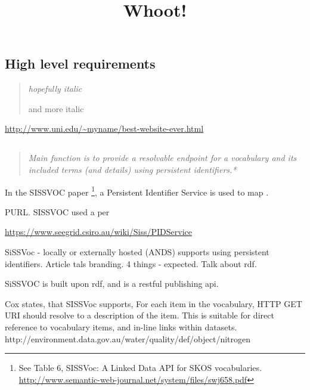 \documentclass[10pt,a4paper]{article}
\title{Whoot!}
\date{}
\newenvironment{italicquotes}
{\begin{quote}\itshape}
{\end{quote}}
\begin{document}
  \maketitle
    \begin{flushleft}
  \setlength{\parindent}{5ex}



\section{High level requirements}

\begin{italicquotes} hopefully italic  

  and more italic
  \end{italicquotes} 

\url{http://www.uni.edu/~myname/best-website-ever.html}



  \subsection{}
  \begin{italicquotes} 
   Main function is to provide a resolvable endpoint for a vocabulary and its
  included terms (and details) using persistent identifiers.* 
  \end{italicquotes} 


  In the SISSVOC paper \footnote{
  See Table 6, SISSVoc: A Linked Data API for SKOS vocabularies.
  \url{http://www.semantic-web-journal.net/system/files/swj658.pdf}
  }, a Persistent Identifier Service is used to map . 


PURL. SISSVOC used a per

  \url{https://www.seegrid.csiro.au/wiki/Siss/PIDService} 

  



  
  SiSSVoc - locally or externally hosted (ANDS) supports using persistent
  identifiers.  Article tals branding. 4 things - expected.  Talk about rdf.

  SiSSVOC is built upon rdf, and is a restful publishing api. 

      Cox states, that SISSVoc supports, For each item in the vocabulary, HTTP GET
  {URI} should resolve to a description of the item. This is suitable for direct
  reference to vocabulary items, and in-line links within datasets.
  http://environment.data.gov.au/water/quality/def/object/nitrogen


\end{flushleft}
\end{document}
